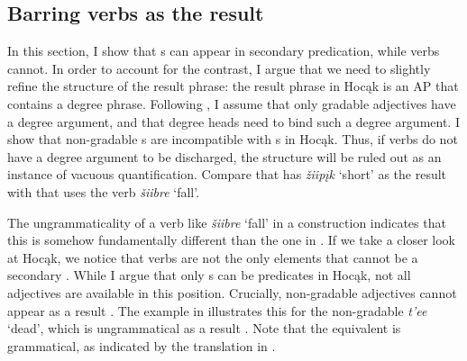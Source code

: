 \documentclass[output=paper]{LSP/langsci}
\begin{document}
\subsection{Barring verbs as the result}

 
In this section, I show that s can appear in  secondary predication, while verbs cannot. In order to account for the contrast, I argue that we need to slightly refine the structure of the result phrase: the result phrase in Hocąk is an AP that contains a degree phrase. Following \citet{Corver1997},  I assume that only gradable adjectives have a degree argument, and that degree heads need to bind such a degree argument. I show that non-gradable s are incompatible with s in Hocąk. Thus, if verbs do not have a degree argument to be discharged, the structure will be ruled out as an instance of vacuous quantification. Compare  that has \textit{žiipįk} `short' as the result with  that uses the verb \textit{šiibre} `fall'.
 

\begin{exe}



\end{exe}

 
The ungrammaticality of a verb like \textit{šiibre} `fall' in a  construction  indicates that this  is somehow fundamentally different than the one in . If we take a closer look at Hocąk, we notice that verbs are not the only elements that cannot be a secondary  . While I argue that only s can be  predicates in Hocąk, not all adjectives are available in this position. Crucially, non-gradable adjectives cannot appear as a result . The example in  illustrates this for the non-gradable  \textit{t'ee} `dead', which is ungrammatical as a result . Note that the  equivalent is grammatical, as indicated by the translation in .
 
\end{document}
